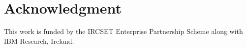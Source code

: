 \documentclass[conference]{IEEEtran}
\begin{document}
%





\section*{Acknowledgment}
This work is funded by the IRCSET Enterprise Partnership Scheme along with IBM Research, Ireland.



%
%
%



\end{document}
